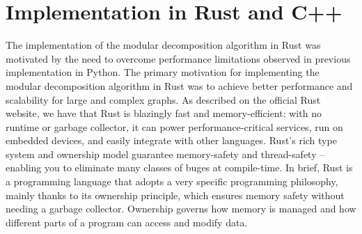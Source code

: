 

\chapter{Implementation in Rust and C++}\label{ch:implementation-in-rust-and-cpp}

The implementation of the modular decomposition algorithm in Rust was motivated by the need to overcome performance limitations observed in previous implementation in Python.
The primary motivation for implementing the modular decomposition algorithm in Rust was to achieve better performance and scalability for large and complex graphs.
As described on the official Rust website, we have that Rust is blazingly fast and memory-efficient: with no runtime or garbage collector, it can power performance-critical services, run on embedded devices, and easily integrate with other languages.
Rust's rich type system and ownership model guarantee memory-safety and thread-safety -- enabling you to eliminate many classes of buges at compile-time.
In brief, Rust is a programming language that adopts a very specific programming philosophy, mainly thanks to its ownership principle, which ensures memory safety without needing a garbage collector.
Ownership governs how memory is managed and how different parts of a program can access and modify data.

